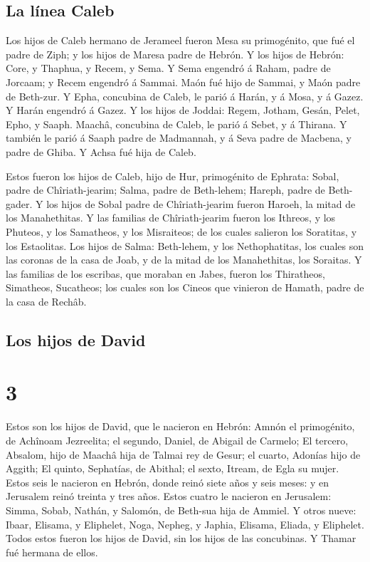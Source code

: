 \hypertarget{la-luxednea-caleb-1}{%
\subsection{La línea Caleb}\label{la-luxednea-caleb-1}}

 Los hijos de Caleb hermano de Jerameel fueron Mesa su
primogénito, que fué el padre de Ziph; y los hijos de Maresa padre de
Hebrón.  Y los hijos de Hebrón: Core, y Thaphua, y Recem, y
Sema.  Y Sema engendró á Raham, padre de Jorcaam; y Recem
engendró á Sammai.  Maón fué hijo de Sammai, y Maón padre
de Beth-zur.  Y Epha, concubina de Caleb, le parió á Harán,
y á Mosa, y á Gazez. Y Harán engendró á Gazez.  Y los hijos
de Joddai: Regem, Jotham, Gesán, Pelet, Epho, y Saaph. 
Maachâ, concubina de Caleb, le parió á Sebet, y á Thirana. 
Y también le parió á Saaph padre de Madmannah, y á Seva padre de
Macbena, y padre de Ghiba. Y Achsa fué hija de Caleb.

 Estos fueron los hijos de Caleb, hijo de Hur, primogénito
de Ephrata: Sobal, padre de Chîriath-jearim;  Salma, padre
de Beth-lehem; Hareph, padre de Beth-gader.  Y los hijos de
Sobal padre de Chîriath-jearim fueron Haroeh, la mitad de los
Manahethitas.  Y las familias de Chîriath-jearim fueron los
Ithreos, y los Phuteos, y los Samatheos, y los Misraiteos; de los cuales
salieron los Soratitas, y los Estaolitas.  Los hijos de
Salma: Beth-lehem, y los Nethophatitas, los cuales son las coronas de la
casa de Joab, y de la mitad de los Manahethitas, los Soraitas.
 Y las familias de los escribas, que moraban en Jabes,
fueron los Thiratheos, Simatheos, Sucatheos; los cuales son los Cineos
que vinieron de Hamath, padre de la casa de Rechâb.

\hypertarget{los-hijos-de-david}{%
\subsection{Los hijos de David}\label{los-hijos-de-david}}

\hypertarget{section-2}{%
\section{3}\label{section-2}}

 Estos son los hijos de David, que le nacieron en Hebrón:
Amnón el primogénito, de Achînoam Jezreelita; el segundo, Daniel, de
Abigail de Carmelo;  El tercero, Absalom, hijo de Maachâ
hija de Talmai rey de Gesur; el cuarto, Adonías hijo de Aggith;
 El quinto, Sephatías, de Abithal; el sexto, Itream, de Egla
su mujer.  Estos seis le nacieron en Hebrón, donde reinó
siete años y seis meses: y en Jerusalem reinó treinta y tres años.
 Estos cuatro le nacieron en Jerusalem: Simma, Sobab,
Nathán, y Salomón, de Beth-sua hija de Ammiel.  Y otros
nueve: Ibaar, Elisama, y Eliphelet,  Noga, Nepheg, y Japhia,
 Elisama, Eliada, y Eliphelet.  Todos estos
fueron los hijos de David, sin los hijos de las concubinas. Y Thamar fué
hermana de ellos.

